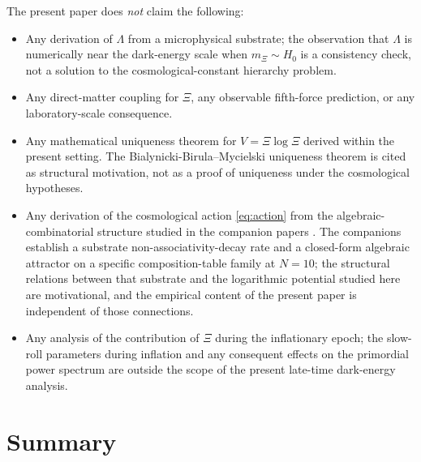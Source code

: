 \documentclass[11pt,reqno]{amsart}
\theoremstyle{plain}
\theoremstyle{definition}
\theoremstyle{remark}
\begin{document}
The present paper does \emph{not} claim the following:
\begin{itemize}
  \item Any derivation of $\Lambda$ from a microphysical substrate; the
        observation that $\Lambda$ is numerically near the dark-energy
        scale when $m_\Xi \sim H_0$ is a consistency check, not a
        solution to the cosmological-constant hierarchy problem.
  \item Any direct-matter coupling for $\Xi$, any observable fifth-force
        prediction, or any laboratory-scale consequence.
  \item Any mathematical uniqueness theorem for $V = \Xi\log\Xi$
        derived within the present setting. The Bialynicki-Birula--Mycielski
        uniqueness theorem \cite{BialynickiBirulaMycielski1976} is cited
        as structural motivation, not as a proof of uniqueness under
        the cosmological hypotheses.
  \item Any derivation of the cosmological action \eqref{eq:action} from
        the algebraic-combinatorial structure studied in the companion
        papers \cite{SandersGishSigma2026,SandersGishFourCore2026}. The
        companions establish a substrate non-associativity-decay rate
        and a closed-form algebraic attractor on a specific
        composition-table family at $N = 10$; the structural relations
        between that substrate and the logarithmic potential studied
        here are motivational, and the empirical content of the present
        paper is independent of those connections.
  \item Any analysis of the contribution of $\Xi$ during the
        inflationary epoch; the slow-roll parameters during inflation
        and any consequent effects on the primordial power spectrum are
        outside the scope of the present late-time dark-energy analysis.
\end{itemize}

\section{Summary}
\end{document}
